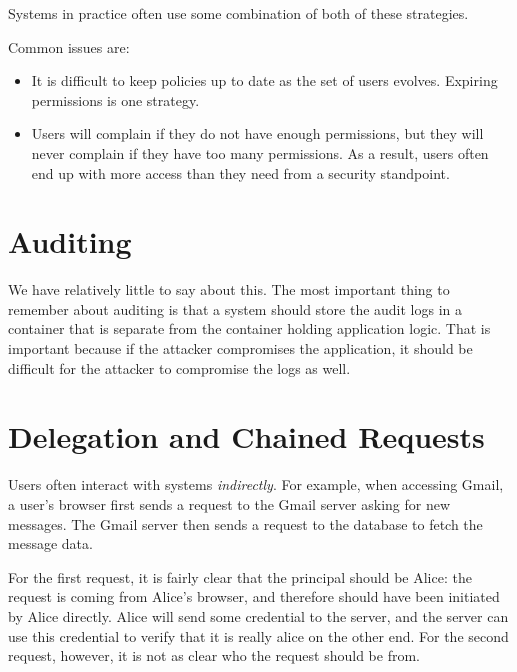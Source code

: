Systems in practice often use some combination of both of these strategies.

Common issues are:
\begin{itemize}
  \item It is difficult to keep policies up to date as the set of users evolves.
        Expiring permissions is one strategy.
  \item Users will complain if they do not have enough permissions, but they will
        never complain if they have too many permissions. As a result, users
        often end up with more access than they need from a security standpoint.
\end{itemize}


\section{Auditing}

We have relatively little to say about this.
The most important thing to remember about auditing is
that a system should store the audit logs in a container
that is separate from the container holding application logic.
That is important because if the attacker compromises
the application, it should be difficult for the attacker
to compromise the logs as well.


\section{Delegation and Chained Requests}
Users often interact with systems \emph{indirectly}.
For example, when accessing Gmail, a user's browser first sends a request to the Gmail server asking for new messages. The Gmail server then sends a request to the database to fetch the message data.

For the first request, it is fairly clear that the principal should be Alice: the request is coming from Alice's browser, and therefore should have been initiated by Alice directly. Alice will send some credential to the server, and the server can use this credential to verify that it is really alice on the other end. For the second request, however, it is not as clear who the request should be from.

